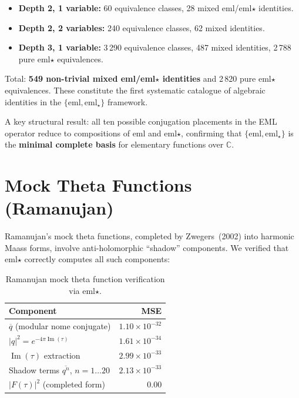 \documentclass[11pt,a4paper]{article}
\begin{document}
\begin{itemize}
\item \textbf{Depth 2, 1 variable:} 60 equivalence classes, 28 mixed eml/eml$\star$ identities.
\item \textbf{Depth 2, 2 variables:} 240 equivalence classes, 62 mixed identities.
\item \textbf{Depth 3, 1 variable:} 3\,290 equivalence classes, 487 mixed identities, 2\,788 pure eml$\star$ equivalences.
\end{itemize}

Total: \textbf{549 non-trivial mixed eml/eml$\star$ identities} and 2\,820 pure
eml$\star$ equivalences.  These constitute the first systematic catalogue of
algebraic identities in the $\{\text{eml}, \text{eml}_\star\}$ framework.

A key structural result: all ten possible conjugation placements in the EML
operator reduce to compositions of eml and eml$\star$, confirming that
$\{\text{eml}, \text{eml}_\star\}$ is the \textbf{minimal complete basis} for
elementary functions over $\mathbb{C}$.

\section{Mock Theta Functions (Ramanujan)}
\label{sec:ramanujan}

Ramanujan's mock theta functions, completed by Zwegers~(2002) into harmonic
Maass forms, involve anti-holomorphic ``shadow'' components.  We verified that
eml$\star$ correctly computes all such components:

\begin{table}[h]
\centering
\caption{Ramanujan mock theta function verification via eml$\star$.}
\label{tab:ramanujan}
\begin{tabular}{lr}
\hline
\textbf{Component} & \textbf{MSE} \\
\hline
$\overline{q}$ (modular nome conjugate) & $1.10\times10^{-32}$ \\
$|q|^2 = e^{-4\pi\operatorname{Im}(\tau)}$ & $1.61\times10^{-34}$ \\
$\operatorname{Im}(\tau)$ extraction & $2.99\times10^{-33}$ \\
Shadow terms $\overline{q^n}$, $n=1\ldots20$ & $2.13\times10^{-33}$ \\
$|F(\tau)|^2$ (completed form) & $0.00$ \\
\hline
\end{tabular}
\end{table}
\end{document}
